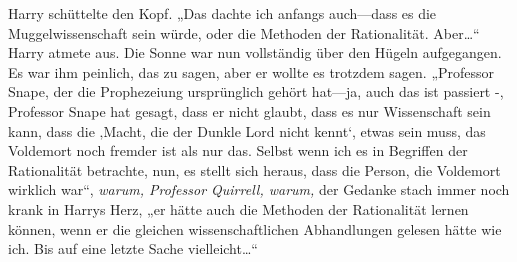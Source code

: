 Harry schüttelte den Kopf.
„Das dachte ich anfangs auch—dass es die Muggelwissenschaft sein würde, oder die Methoden der Rationalität. Aber…“
Harry atmete aus. Die Sonne war nun vollständig über den Hügeln aufgegangen. Es war ihm peinlich, das zu sagen, aber er wollte es trotzdem sagen.
„Professor Snape, der die Prophezeiung ursprünglich gehört hat—ja, auch das ist passiert -, Professor Snape hat gesagt, dass er nicht glaubt, dass es nur Wissenschaft sein kann, dass die ‚Macht, die der Dunkle Lord nicht kennt‘, etwas sein muss, das Voldemort noch fremder ist als nur das. Selbst wenn ich es in Begriffen der Rationalität betrachte, nun, es stellt sich heraus, dass die Person, die Voldemort wirklich war“,
\emph{warum, Professor Quirrell, warum,} der Gedanke stach immer noch krank in Harrys Herz,
„er hätte auch die Methoden der Rationalität lernen können, wenn er die gleichen wissenschaftlichen Abhandlungen gelesen hätte wie ich. Bis auf eine letzte Sache vielleicht…“
